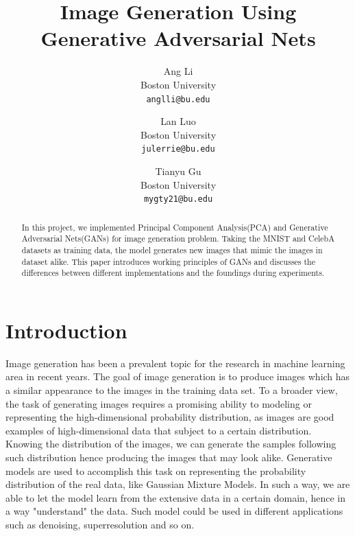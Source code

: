 \documentclass[10pt,twocolumn,letterpaper]{article}
\begin{document}
\title{Image Generation Using Generative Adversarial Nets}

\author{Ang Li\\
Boston University\\
{\tt\small anglli@bu.edu}
\and
Lan Luo\\
Boston University\\
{\tt\small julerrie@bu.edu}
\and
Tianyu Gu\\
Boston University\\
{\tt\small mygty21@bu.edu}
}

\maketitle

\begin{abstract}
In this project, we implemented Principal Component Analysis(PCA) and Generative Adversarial Nets(GANs) for image generation problem. Taking the MNIST and CelebA datasets as training data, the model generates new images that mimic the images in dataset alike. This paper introduces working principles of GANs and discusses the differences between different implementations and the foundings during experiments.
\end{abstract}

\section{Introduction}

Image generation has been a prevalent topic for the research in machine learning area in recent years. The goal of image generation is to produce images which has a similar appearance to the images in the training data set. To a broader view, the task of generating images requires a promising ability to modeling or representing the high-dimensional probability distribution, as images are good examples of high-dimensional data that subject to a certain distribution. Knowing the distribution of the images, we can generate the samples following such distribution hence producing the images that may look alike. Generative models are used to accomplish this task on representing the probability distribution of the real data, like Gaussian Mixture Models\cite{mclachlan1988mixture}. In such a way, we are able to let the model learn from the extensive data in a certain domain, hence in a way "understand" the data. Such model could be used in different applications such as denoising, superresolution and so on.\\
\end{document}
